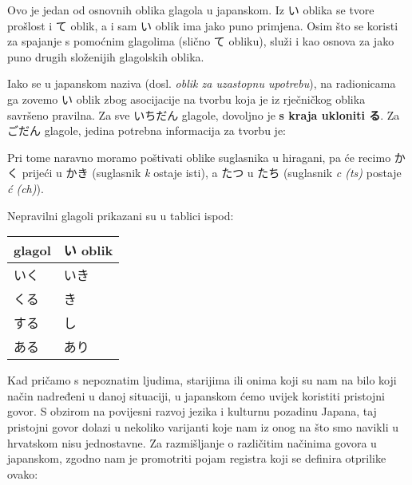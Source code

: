 
\author{Tomislav Mamić}


	
	
	Ovo je jedan od osnovnih oblika glagola u japanskom. Iz い oblika se tvore prošlost i て oblik, a i sam い oblik ima jako puno primjena. Osim što se koristi za spajanje s pomoćnim glagolima (slično て obliku), služi i kao osnova za jako puno drugih složenijih glagolskih oblika.
	
	
	Iako se u japanskom naziva  (dosl. \textit{oblik za uzastopnu upotrebu}), na radionicama ga zovemo い oblik zbog asocijacije na tvorbu koja je iz rječničkog oblika savršeno pravilna. Za sve いちだん glagole, dovoljno je \textbf{s kraja ukloniti る}. Za ごだん glagole, jedina potrebna informacija za tvorbu je:
	
	
	Pri tome naravno moramo poštivati oblike suglasnika u hiragani, pa će recimo かく prijeći u かき (suglasnik \textit{k} ostaje isti), a たつ u たち (suglasnik \textit{c (ts)} postaje \textit{ć (ch)}).
	
	Nepravilni glagoli prikazani su u tablici ispod:
	
	\vspace{10pt}
	\begin{tabular}{|l|l|}
		\hline
		\textbf{glagol}&\textbf{い oblik}\\
		\hline
		いく&いき\\
		\hline
		くる&き\\
		\hline
		する&し\\
		\hline
		ある&あり\\
		\hline
	\end{tabular}
	
	
	Kad pričamo s nepoznatim ljudima, starijima ili onima koji su nam na bilo koji način nadređeni u danoj situaciji, u japanskom ćemo uvijek koristiti pristojni govor. S obzirom na povijesni razvoj jezika i kulturnu pozadinu Japana, taj pristojni govor dolazi u nekoliko varijanti koje nam iz onog na što smo navikli u hrvatskom nisu jednostavne. Za razmišljanje o različitim načinima govora u japanskom, zgodno nam je promotriti pojam registra koji se definira otprilike ovako:
	
